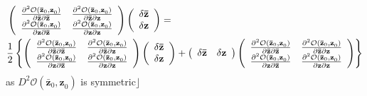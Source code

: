 \documentclass[aps,preprint]{revtex4}%
\begin{document}
\begin{align}
&  \left(
\begin{array}
[c]{cc}%
\frac{\partial^{2}\mathcal{O}\left(  \mathbf{\bar{z}}_{0}\mathbf{,z}%
_{0}\right)  }{\partial\mathbf{\bar{z}}\partial\mathbf{\bar{z}}} &
\frac{\partial^{2}\mathcal{O}\left(  \mathbf{\bar{z}}_{0}\mathbf{,z}%
_{0}\right)  }{\partial\mathbf{\bar{z}}\partial\mathbf{z}}\\
\frac{\partial^{2}\mathcal{O}\left(  \mathbf{\bar{z}}_{0}\mathbf{,z}%
_{0}\right)  }{\partial\mathbf{z}\partial\mathbf{\bar{z}}} & \frac
{\partial^{2}\mathcal{O}\left(  \mathbf{\bar{z}}_{0}\mathbf{,z}_{0}\right)
}{\partial\mathbf{z}\partial\mathbf{z}}%
\end{array}
\right)  \left(
\begin{array}
[c]{c}%
\delta\mathbf{\bar{z}}\\
\delta\mathbf{z}%
\end{array}
\right)  =\nonumber\\
&  \frac{1}{2}\left\{  \left(
\begin{array}
[c]{cc}%
\frac{\partial^{2}\mathcal{O}\left(  \mathbf{\bar{z}}_{0}\mathbf{,z}%
_{0}\right)  }{\partial\mathbf{\bar{z}}\partial\mathbf{\bar{z}}} &
\frac{\partial^{2}\mathcal{O}\left(  \mathbf{\bar{z}}_{0}\mathbf{,z}%
_{0}\right)  }{\partial\mathbf{\bar{z}}\partial\mathbf{z}}\\
\frac{\partial^{2}\mathcal{O}\left(  \mathbf{\bar{z}}_{0}\mathbf{,z}%
_{0}\right)  }{\partial\mathbf{z}\partial\mathbf{\bar{z}}} & \frac
{\partial^{2}\mathcal{O}\left(  \mathbf{\bar{z}}_{0}\mathbf{,z}_{0}\right)
}{\partial\mathbf{z}\partial\mathbf{z}}%
\end{array}
\right)  \left(
\begin{array}
[c]{c}%
\delta\mathbf{\bar{z}}\\
\delta\mathbf{z}%
\end{array}
\right)  +\left(
\begin{array}
[c]{cc}%
\delta\mathbf{\bar{z}} & \delta\mathbf{z}%
\end{array}
\right)  \left(
\begin{array}
[c]{cc}%
\frac{\partial^{2}\mathcal{O}\left(  \mathbf{\bar{z}}_{0}\mathbf{,z}%
_{0}\right)  }{\partial\mathbf{\bar{z}}\partial\mathbf{\bar{z}}} &
\frac{\partial^{2}\mathcal{O}\left(  \mathbf{\bar{z}}_{0}\mathbf{,z}%
_{0}\right)  }{\partial\mathbf{\bar{z}}\partial\mathbf{z}}\\
\frac{\partial^{2}\mathcal{O}\left(  \mathbf{\bar{z}}_{0}\mathbf{,z}%
_{0}\right)  }{\partial\mathbf{z}\partial\mathbf{\bar{z}}} & \frac
{\partial^{2}\mathcal{O}\left(  \mathbf{\bar{z}}_{0}\mathbf{,z}_{0}\right)
}{\partial\mathbf{z}\partial\mathbf{z}}%
\end{array}
\right)  \right\}
\end{align}
as $D^{2}\mathcal{O}\left(  \mathbf{\bar{z}}_{0}\mathbf{,z}_{0}\right)  $ is
symmetric$\rfloor$
\end{document}
